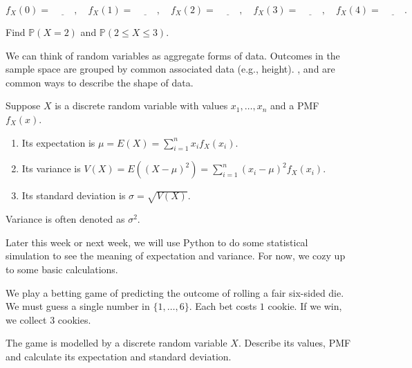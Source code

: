 \documentclass[../main.tex]{subfiles}
\begin{document}
\begin{exercise}
\[  \]
  \[
    f_{X}(0) = \underline{\hspace{1cm}}, \quad f_{X}(1) = \underline{\hspace{1cm}},  \quad f_{X}(2) = \underline{\hspace{1cm}},  \quad f_{X}(3) = \underline{\hspace{1cm}},  \quad f_{X}(4) = \underline{\hspace{1cm}}.
  \]
  
  Find \(\mathbb{P}(X = 2)\) and \(\mathbb{P}(2 \le X \le 3)\).

  \blanks*

\end{exercise}
\clearpage

We can think of random variables as aggregate  forms of data.  Outcomes in the sample space are grouped by common associated data (e.g., height).  ,  and   are common ways to describe the shape of data.

\begin{definition} \label{def:drv-expectation-variance}
  Suppose \(X\) is a discrete random variable with values \(x_{1}, \ldots, x_{n}\) and a PMF \(f_{X}(x)\).
  \begin{enumerate}[itemsep={1ex}]
    \item Its expectation is \(\mu = E(X) = \sum_{i=1}^{n} x_{i} f_{X}(x_{i})\).
    \item Its variance is \(V(X) = E\left( (X - \mu)^{2} \right) = \sum_{i=1}^{n} (x_{i} - \mu)^{2} f_{X}(x_{i})\).
    \item Its standard deviation is \(\sigma = \sqrt{V(X)}\). 
  \end{enumerate}

  Variance is often denoted as \(\sigma^{2}\).
\end{definition}

Later this week or next week, we will use Python to do some statistical simulation to see the meaning of expectation and variance. For now, we cozy up to some basic calculations.

\begin{example} \label{ex:drv-betting-game}
  We play a betting game of predicting the outcome of rolling a fair six-sided die. We must guess a single number in \(\{1, \ldots, 6\}\). Each bet costs \(1\) cookie. If we win, we collect \(3\) cookies.

  The game is modelled by a discrete random variable \(X\).  Describe its values, PMF and calculate its expectation and standard deviation.

  \blanks*
\end{example}
\end{document}
